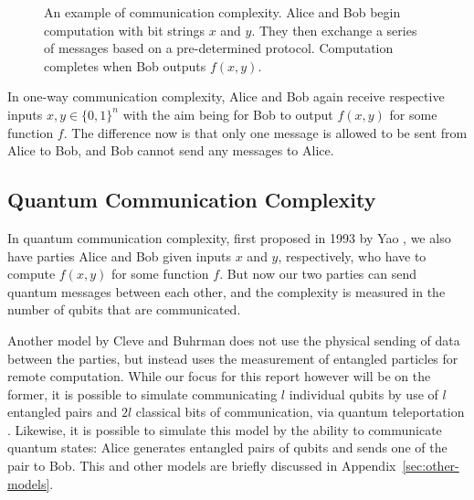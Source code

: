 \documentclass[a4paper]{article}
\begin{document}
        \begin{figure}
            \centering
            \caption{An example of communication complexity. Alice and Bob begin computation with bit strings $x$ and $y$. They then exchange a series of messages based on a pre-determined protocol. Computation completes when Bob outputs $f(x, y)$.}
            \label{fig:cc}
        \end{figure}

        In one-way communication complexity, Alice and Bob again receive respective inputs $x, y \in \{0, 1\}^n$ with the aim being for Bob to output $f(x, y)$ for some function $f$. The difference now is that only one message is allowed to be sent from Alice to Bob, and Bob cannot send any messages to Alice.

        \subsection{Quantum Communication Complexity}

        In quantum communication complexity, first proposed in 1993 by Yao \cite{366852}, we also have parties Alice and Bob given inputs $x$ and $y$, respectively, who have to compute $f(x, y)$ for some function $f$. But now our two parties can send quantum messages between each other, and the complexity is measured in the number of qubits that are communicated.

        Another model by Cleve and Buhrman \cite{PhysRevA.56.1201} does not use the physical sending of data between the parties, but instead uses the measurement of entangled particles for remote computation. While our focus for this report however will be on the former, it is possible to simulate communicating $l$ individual qubits by use of $l$ entangled pairs and $2l$ classical bits of communication, via quantum teleportation \cite{PhysRevLett.70.1895}. Likewise, it is possible to simulate this model by the ability to communicate quantum states: Alice generates entangled pairs of qubits and sends one of the pair to Bob. This and other models are briefly discussed in Appendix~\ref{sec:other-models}.
\end{document}
